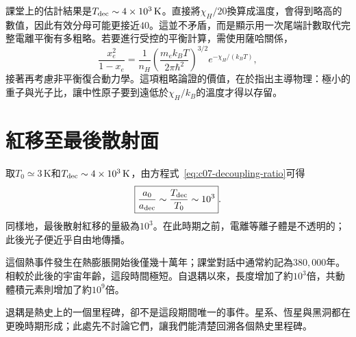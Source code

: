 \begin{classroomqa}
\end{classroomqa}

\begin{classroomqa}
\end{classroomqa}

課堂上的估計結果是\(T_{\rm dec}\sim4\times10^3\,\mathrm{K}\)。直接將\(\chi_H/20\)換算成溫度，會得到略高的數值，因此有效分母可能更接近\(40\)。這並不矛盾，而是顯示用一次尾端計數取代完整電離平衡有多粗略。若要進行受控的平衡計算，需使用薩哈關係，
\begin{equation}
\frac{x_e^2}{1-x_e}
=
\frac{1}{n_H}
\left(\frac{m_e k_BT}{2\pi\hbar^2}\right)^{3/2}
e^{-\chi_H/(k_BT)},
\label{eq:c07-saha}
\end{equation}
接著再考慮非平衡復合動力學。這項粗略論證的價值，在於指出主導物理：極小的重子與光子比，讓中性原子要到遠低於\(\chi_H/k_B\)的溫度才得以存留。

\section{紅移至最後散射面}

取\(T_0\simeq3\,\mathrm{K}\)和\(T_{\rm dec}\sim4\times10^3\,\mathrm{K}\)，由方程式~\eqref{eq:c07-decoupling-ratio}可得
\begin{equation}
\boxed{
\frac{a_0}{a_{\rm dec}}
\sim
\frac{T_{\rm dec}}{T_0}
\sim10^3
}.
\label{eq:c07-decoupling-expansion}
\end{equation}
同樣地，最後散射紅移的量級為\(10^3\)。在此時期之前，電離等離子體是不透明的；此後光子便近乎自由地傳播。

這個熱事件發生在熱膨脹開始後僅幾十萬年；課堂對話中通常約記為\(380{,}000\)年。相較於此後的宇宙年齡，這段時間極短。自退耦以來，長度增加了約\(10^3\)倍，共動體積元素則增加了約\(10^9\)倍。

退耦是熱史上的一個里程碑，卻不是這段期間唯一的事件。星系、恆星與黑洞都在更晚時期形成；此處先不討論它們，讓我們能清楚回溯各個熱史里程碑。

